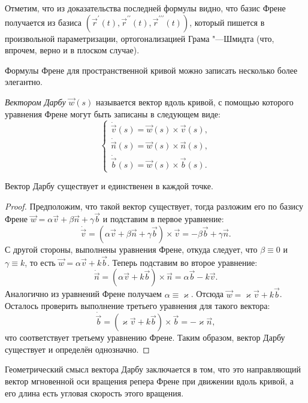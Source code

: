 Отметим, что из доказательства последней формулы видно, что базис Френе получается из базиса $(\vec{r}^\prime(t), \vec{r}^{\prime\prime}(t), \vec{r}^{\prime\prime\prime}(t))$, который пишется в произвольной параметризации, ортогонализацией Грама "---Шмидта (что, впрочем, верно и в плоском случае).

\noindent
Формулы Френе для пространственной кривой можно записать несколько более элегантно.

\begin{definition}
	\textit{Вектором Дарбу} $\vec{w}(s)$ называется вектор вдоль кривой, с помощью которого уравнения Френе могут быть записаны в следующем виде:
	\[
		\begin{cases}
			\dot{\vec{v}}(s) = \vec{w}(s) \times \vec{v}(s),\\
			\dot{\vec{n}}(s) = \vec{w}(s) \times \vec{n}(s),\\
			\dot{\vec{b}}(s) = \vec{w}(s) \times \vec{b}(s).
		\end{cases}
	\]
\end{definition}

\begin{theorem}
	Вектор Дарбу существует и единственен в каждой точке.
\end{theorem}

\begin{proof}
	Предположим, что такой вектор существует, тогда разложим его по базису Френе $\vec{w} = \alpha\vec{v} + \beta\vec{n} + \gamma\vec{b}$ и подставим в первое уравнение:
	\[
		\dot{\vec{v}} = (\alpha\vec{v} + \beta\vec{n} + \gamma\vec{b}) \times \vec{v} = -\beta\vec{b} + \gamma\vec{n}.
	\]
	С другой стороны, выполнены уравнения Френе, откуда следует, что $\beta \equiv 0$ и $\gamma \equiv k$, то есть $\vec{w} = \alpha\vec{v} + k\vec{b}$. Теперь подставим во второе уравнение:
	\[
		\dot{\vec{n}} = (\alpha\vec{v} + k\vec{b}) \times \vec{n} = \alpha\vec{b} - k\vec{v}.
	\]
	Аналогично из уравнений Френе получаем $\alpha \equiv \varkappa$. Отсюда $\vec{w} = \varkappa\vec{v} + k\vec{b}$. Осталось проверить выполнение третьего уравнения для такого вектора:
	\[
		\dot{\vec{b}} = (\varkappa\vec{v} + k\vec{b}) \times \vec{b} = -\varkappa\vec{n},
	\]
	что соответствует третьему уравнению Френе. Таким образом, вектор Дарбу существует и определён однозначно.
\end{proof}

Геометрический смысл вектора Дарбу заключается в том, что это направляющий вектор мгновенной оси вращения репера Френе при движении вдоль кривой, а его длина есть угловая скорость этого вращения.

